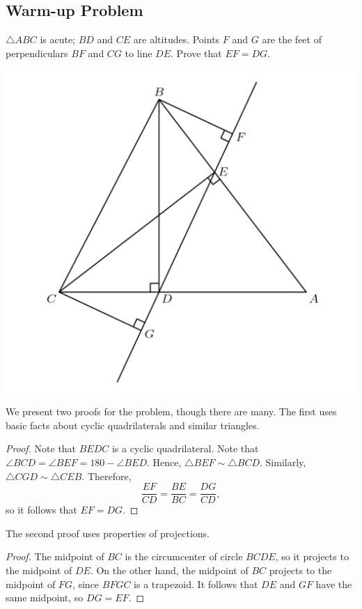 \documentclass[12pt]{scrartcl}
\newcommand{\<}{\langle}
\renewcommand{\>}{\rangle}
\begin{document}
\subsection{Warm-up Problem}
\begin{Prob} $\triangle ABC$ is acute; $BD$ and $CE$ are altitudes.  Points $F$ and $G$ are the feet of perpendiculars $BF$ and $CG$ to line $DE$.  Prove that $EF = DG$.
\end{Prob}
\begin{center}
\includegraphics[scale=0.4]{graphics/p2-1.png}
\end{center}
We present two proofs for the problem, though there are many.  The first uses basic facts about cyclic quadrilaterals and similar triangles.
\begin{proof}
Note that $BEDC$ is a cyclic quadrilateral.  Note that $\angle BCD = \angle BEF = 180 - \angle BED$.    Hence, $\triangle BEF \sim \triangle BCD$.  Similarly, $\triangle CGD \sim \triangle CEB$. Therefore,
$$\frac{EF}{CD} = \frac{BE}{BC} = \frac{DG}{CD},$$
so it follows that $EF = DG$.
\end{proof}
The second proof uses properties of projections.
\begin{proof}
The midpoint of $BC$ is the circumcenter of circle $BCDE$, so it projects to the midpoint of $DE$. On the other hand, the midpoint of $BC$ projects to the midpoint of $FG$, since $BFGC$ is a trapezoid. It follows that $DE$ and $GF$ have the same midpoint, so $DG=EF$.
\end{proof}
\end{document}
